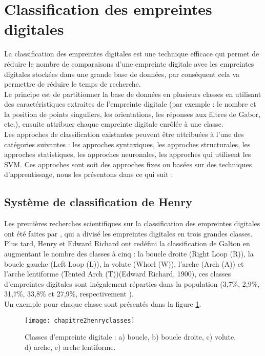 \section{Classification des empreintes digitales}
\label{fingerprintclassification}
La classification des empreintes digitales est une technique efficace qui permet de réduire le nombre de comparaisons d'une empreinte digitale avec les empreintes digitales stockées dans une grande base de données, par conséquent cela va permettre de réduire le temps de recherche.
\\ Le principe est de partitionner la base de données en plusieurs classes en utilisant des caractéristiques extraites de l'empreinte digitale (par exemple : le nombre et la position de points singuliers, les orientations, les réponses aux filtres de Gabor, etc.), ensuite attribuer chaque empreinte digitale enrôlée à une classe. \\
Les approches de classification existantes peuvent être attribuées à l'une des catégories suivantes : les approches syntaxiques, les approches structurales, les approches statistiques, les approches neuronales, les approches qui utilisent les SVM. Ces approches sont soit des approches fixes ou basées sur des techniques d'apprentissage, nous les présentons dans ce qui suit :
\subsection{Système de classification de Henry}
Les premières recherches scientifiques sur la classification des empreintes digitales ont été faites par \citep{galton1892finger}, qui a divisé les empreintes digitales en trois grandes classes. Plus tard, Henry et Edward Richard ont redéfini la classification de Galton en augmentant le nombre des classes à cinq \citep{henry1905classification} : la boucle droite (Right Loop (R)), la boucle gauche (Left Loop (L)), la volute (Whorl (W)), l'arche (Arch (A)) et l'arche lentiforme (Tented Arch (T))(Edward Richard, 1900), ces classes d'empreintes digitales sont inégalement réparties dans la population (3,7\%, 2,9\%, 31,7\%, 33,8\% et 27,9\%, respectivement \citep{peralta2017robust}). 
\\ Un exemple pour chaque classe sont présentés dans la figure \ref{fig:chapitre2henryclasses}. 
\begin{figure}[H]
	\centering
	\texttt{[image: chapitre2henryclasses]}
	\caption{Classes d'empreinte digitale : a) boucle, b) boucle droite, c) volute, d) arche, e) arche lentiforme.}
	\label{fig:chapitre2henryclasses}
\end{figure}


